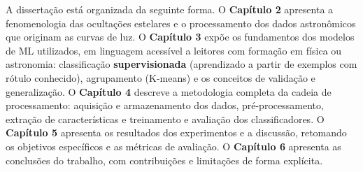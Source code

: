 A dissertação está organizada da seguinte forma. O \textbf{Capítulo 2} apresenta a fenomenologia das ocultações estelares e o processamento dos dados astronômicos que originam as curvas de luz. O \textbf{Capítulo 3} expõe os fundamentos dos modelos de ML utilizados, em linguagem acessível a leitores com formação em física ou astronomia: classificação \textbf{supervisionada} (aprendizado a partir de exemplos com rótulo conhecido), agrupamento (K-means) e os conceitos de validação e generalização. O \textbf{Capítulo 4} descreve a metodologia completa da cadeia de processamento: aquisição e armazenamento dos dados, pré-processamento, extração de características e treinamento e avaliação dos classificadores. O \textbf{Capítulo 5} apresenta os resultados dos experimentos e a discussão, retomando os objetivos específicos e as métricas de avaliação. O \textbf{Capítulo 6} apresenta as conclusões do trabalho, com contribuições e limitações de forma explícita.
